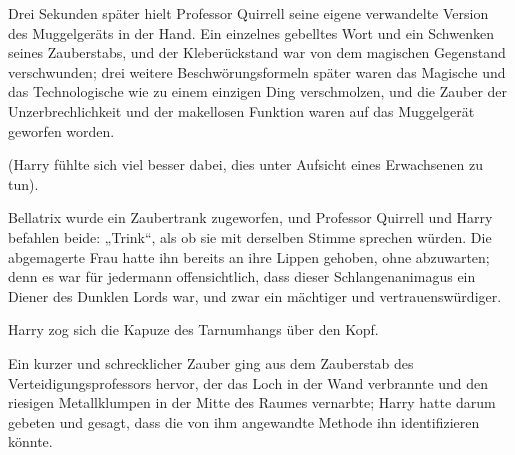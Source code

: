 Drei Sekunden später hielt Professor Quirrell seine eigene verwandelte Version des Muggelgeräts in der Hand. Ein einzelnes gebelltes Wort und ein Schwenken seines Zauberstabs, und der Kleberückstand war von dem magischen Gegenstand verschwunden; drei weitere Beschwörungsformeln später waren das Magische und das Technologische wie zu einem einzigen Ding verschmolzen, und die Zauber der Unzerbrechlichkeit und der makellosen Funktion waren auf das Muggelgerät geworfen worden.

(Harry fühlte sich viel besser dabei, dies unter Aufsicht eines Erwachsenen zu tun).

Bellatrix wurde ein Zaubertrank zugeworfen, und Professor Quirrell und Harry befahlen beide: „Trink“, als ob sie mit derselben Stimme sprechen würden. Die abgemagerte Frau hatte ihn bereits an ihre Lippen gehoben, ohne abzuwarten; denn es war für jedermann offensichtlich, dass dieser Schlangenanimagus ein Diener des Dunklen Lords war, und zwar ein mächtiger und vertrauenswürdiger.

Harry zog sich die Kapuze des Tarnumhangs über den Kopf.

Ein kurzer und schrecklicher Zauber ging aus dem Zauberstab des Verteidigungsprofessors hervor, der das Loch in der Wand verbrannte und den riesigen Metallklumpen in der Mitte des Raumes vernarbte; Harry hatte darum gebeten und gesagt, dass die von ihm angewandte Methode ihn identifizieren könnte.


